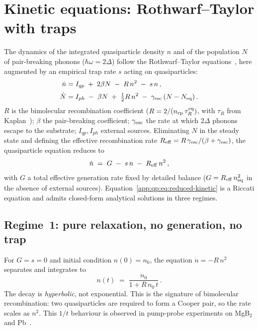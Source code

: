 \section{Kinetic equations: Rothwarf--Taylor with traps}
\label{app:qp:kinetic}

The dynamics of the integrated quasiparticle density $n$ and of the population
$N$ of pair-breaking phonons ($\hbar\omega = 2\Delta$) follow the
Rothwarf--Taylor equations~\cite{Rothwarf1967}, here augmented by an
empirical trap rate $s$ acting on quasiparticles:
\begin{align}
  \dot n &= I_{qp} \;+\; 2\beta N \;-\; R\,n^2 \;-\; s\,n\,,
  \label{app:qp:eq:RT-n}\\[2pt]
  \dot N &= I_{ph} \;-\; \beta N \;+\; \tfrac{1}{2} R\,n^2
            \;-\; \gamma_{\rm esc}\,(N - N_{\rm eq})\,.
  \label{app:qp:eq:RT-N}
\end{align}
$R$ is the bimolecular recombination coefficient
($R = 2/(n_{\rm cp}\,\tau_R^{\rm eq})$, with $\tau_R$ from
Kaplan~\cite{Kaplan1976}); $\beta$ the pair-breaking coefficient;
$\gamma_{\rm esc}$ the rate at which $2\Delta$ phonons escape to the
substrate; $I_{qp}, I_{ph}$ external sources.  Eliminating $N$ in the steady
state and defining the effective recombination rate
$R_{\rm eff} = R\,\gamma_{\rm esc}/(\beta + \gamma_{\rm esc})$, the
quasiparticle equation reduces to
\begin{equation}
  \dot n
  \;=\; G \;-\; s\,n \;-\; R_{\rm eff}\,n^2\,,
  \label{app:qp:eq:reduced-kinetic}
\end{equation}
with $G$ a total effective generation rate fixed by detailed balance
($G = R_{\rm eff}\,n_{\rm eq}^2$ in the absence of external sources).
Equation~\eqref{app:qp:eq:reduced-kinetic} is a Riccati equation and admits
closed-form analytical solutions in three regimes.

\subsection{Regime~1: pure relaxation, no generation, no trap}

For $G=s=0$ and initial condition $n(0)=n_0$, the equation
$\dot n = -R\,n^2$ separates and integrates to
\begin{equation}
  n(t) \;=\; \frac{n_0}{1 + R\,n_0\, t}\,.
  \label{app:qp:eq:hyperbolic-decay}
\end{equation}
The decay is \emph{hyperbolic}, not exponential. This is the signature of
bimolecular recombination: two quasiparticles are required to form a Cooper
pair, so the rate scales as $n^2$. This $1/t$ behaviour is observed in
pump-probe experiments on MgB$_2$ and Pb~\cite{Demsar2003}.

